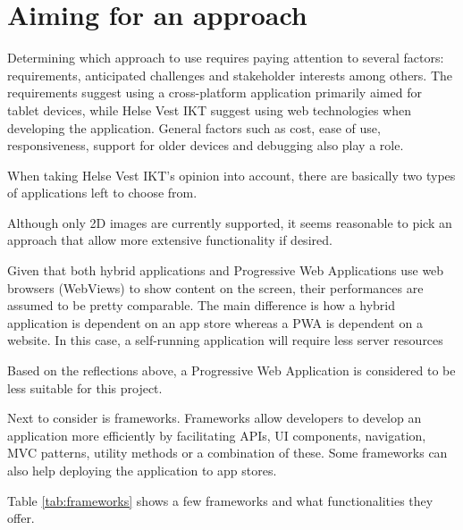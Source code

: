 \section{Aiming for an approach}

Determining which approach to use requires paying attention to several factors: requirements, anticipated challenges and stakeholder interests among others. The requirements suggest using a cross-platform application primarily aimed for tablet devices, while Helse Vest IKT suggest using web technologies when developing the application. General factors such as cost, ease of use, responsiveness, support for older devices and debugging also play a role.

When taking Helse Vest IKT's opinion into account, there are basically two types of applications left to choose from. 

Although only 2D images are currently supported, it seems reasonable to pick an approach that allow more extensive functionality if desired.

Given that both hybrid applications and Progressive Web Applications use web browsers (WebViews) to show content on the screen, their performances are assumed to be pretty comparable. The main difference is how a hybrid application is dependent on an app store whereas a PWA is dependent on a website. In this case, a self-running application will require less server resources

Based on the reflections above, a Progressive Web Application is considered to be less suitable for this project.

Next to consider is frameworks. Frameworks allow developers to develop an application more efficiently by facilitating APIs, UI components, navigation, MVC patterns, utility methods or a combination of these. Some frameworks can also help deploying the application to app stores.

Table \ref{tab:frameworks} shows a few frameworks and what functionalities they offer.

